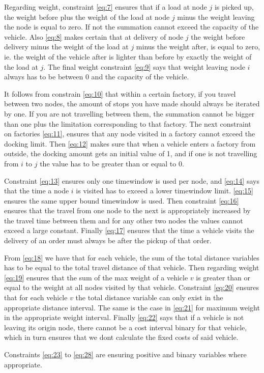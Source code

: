 \documentclass[a4paper,10pt]{article}
\begin{document}
Regarding weight, constraint \ref{eq:7} ensures that if a load at node $j$ is picked up, the weight before plus the weight of the load at node $j$ minus the weight leaving the node is equal to zero. If not the summation cannot exceed the capacity of the vehicle.
Also \ref{eq:8} makes certain that at delivery of node $j$ the weight before delivery minus the weight of the load at $j$ minus the weight after, is equal to zero, ie. the weight of the vehicle after is lighter than before by exactly the weight of the load at $j$. The final weight constraint \ref{eq:9} says that weight leaving node $i$ always has to be between $0$ and the capacity of the vehicle. \par

It follows from constrain \ref{eq:10} that within a certain factory, if you travel between two nodes, the amount of stops you have made should always be iterated by one. 
If you are not travelling between them, the summation cannot be bigger than one plus the limitation corresponding to that factory.
The next constraint on factories \ref{eq:11}, ensures that any node visited in a factory cannot exceed the docking limit.
Then \ref{eq:12} makes sure that when a vehicle enters a factory from outside, the docking amount gets an initial value of 1, and if one is not travelling from $i$ to $j$ the value has to be greater than or equal to 0. \par

Constraint \ref{eq:13} ensures only one timewindow is used per node, and \ref{eq:14} says that the time a node $i$ is visited has to exceed a lower timewindow limit.
\ref{eq:15} ensures the same upper bound timewindow is used. 
Then constraint \ref{eq:16} ensures that the travel from one node to the next is appropriately increased by the travel time between them and for any other two nodes the values cannot exceed a large constant.
Finally \ref{eq:17} ensures that the time a vehicle visits the delivery of an order must always be after the pickup of that order. \par

From \ref{eq:18} we have that for each vehicle, the sum of the total distance variables has to be equal to the total travel distance of that vehicle.
Then regarding weight \ref{eq:19} ensures that the sum of the max weight of a vehicle $v$ is greater than or equal to the weight at all nodes visited by that vehicle.
Constraint \ref{eq:20} ensures that for each vehicle $v$ the total distance variable can only exist in the appropriate distance interval.
The same is the case in \ref{eq:21} for maximum weight in the appropriate weight interval.
Finally \ref{eq:22} says that if a vehicle is not leaving its origin node, there cannot be a cost interval binary for that vehicle, which in turn ensures that we dont calculate the fixed costs of said vehicle. \par
Constraints \ref{eq:23} to \ref{eq:28} are ensuring positive and binary variables where appropriate.  \par
\end{document}
